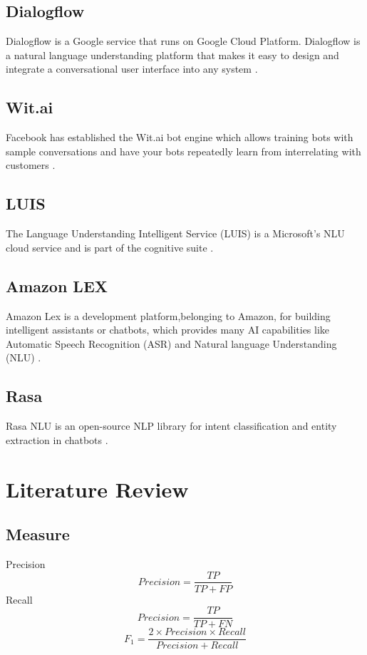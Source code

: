 \documentclass[conference]{IEEEtran}
\begin{document}
\subsection{Dialogflow}
Dialogflow is a Google service that runs on Google Cloud Platform. Dialogflow is a natural language understanding platform that makes it easy to design and integrate a conversational user interface into any system \cite{dialogflow2020}.
\subsection{Wit.ai}
Facebook has established the Wit.ai bot engine which allows training bots with sample conversations and have your bots repeatedly learn from interrelating with customers \cite{seligman2018artificial}.
\subsection{LUIS}
The Language Understanding Intelligent Service (LUIS) is a Microsoft's NLU cloud service and is part of the cognitive suite \cite{pathak2018iot}.
\subsection{Amazon LEX}
Amazon Lex is a development platform,belonging to Amazon, for building intelligent assistants or chatbots, which provides many AI capabilities like Automatic Speech Recognition (ASR) and Natural language Understanding (NLU) \cite{tripuraneni2019hands}.
\subsection{Rasa}
Rasa NLU is an open-source NLP library for intent classification and entity extraction in chatbots \cite{raj2018building}.

\section{Literature Review}
\subsection{Measure}
Precision
\begin{equation}
    Precision=\frac{TP}{TP+FP}\label{eq}
\end{equation}
Recall
\begin{equation}
    Precision=\frac{TP}{TP+FN}\label{eq}
\end{equation}
\begin{equation}
    F_{1} =\frac{2 \times Precision\times Recall}{Precision+Recall}\label{eq}
\end{equation}
\end{document}
